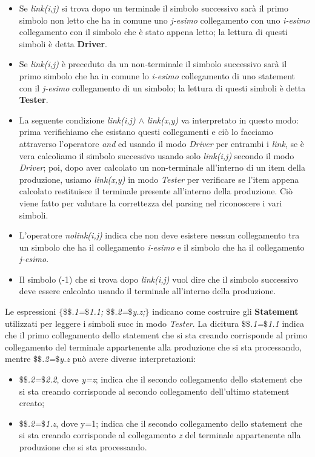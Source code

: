 \begin{itemize}
	\item Se \textit{link(i,j)} si trova dopo un terminale il simbolo successivo sarà il primo simbolo non letto che ha in comune uno \textit{j-esimo} collegamento con uno \textit{i-esimo} collegamento con il simbolo che è stato appena letto; la lettura di questi simboli è detta \textbf{Driver}.
	\item Se \textit{link(i,j)} è preceduto da un non-terminale il simbolo successivo sarà il primo simbolo che ha in comune lo \textit{i-esimo} collegamento di uno statement con il \textit{j-esimo} collegamento di un simbolo; la lettura di questi simboli è detta \textbf{Tester}.
	\item La seguente condizione \textit{link(i,j) $\wedge$ link(x,y)} va interpretato in questo modo: prima verifichiamo che esistano questi collegamenti e ciò lo facciamo attraverso l'operatore \textit{and} ed usando il modo \textit{Driver} per entrambi i \textit{link}, se è vera calcoliamo il simbolo successivo usando solo \textit{link(i,j)} secondo il modo \textit{Driver}; poi, dopo aver calcolato un non-terminale all'interno di un item della produzione, usiamo \textit{link(x,y)} in modo \textit{Tester} per verificare se l'item appena calcolato restituisce il terminale presente all'interno della produzione. Ciò viene fatto per valutare la correttezza del parsing nel riconoscere i vari simboli.
	\item L'operatore \textit{nolink(i,j)} indica che non deve esistere nessun collegamento tra un simbolo che ha il collegamento \textit{i-esimo} e il simbolo che ha il collegamento \textit{j-esimo}.
	\item Il simbolo (-1) che si trova dopo \textit{link(i,j)} vuol dire che il simbolo successivo deve essere calcolato usando il terminale all'interno della produzione.
\end{itemize} 
Le espressioni \textit{$\{$$\$\$$.1=$\$$1.1; $\$\$$.2=$\$$y.z;$\}$} indicano come costruire gli \textbf{Statement} utilizzati per leggere i simboli succ in modo \textit{Tester}. La dicitura \textit{$\$\$$.1=$\$$1.1} indica che il primo collegamento dello statement che si sta creando corrisponde al primo collegamento del terminale appartenente alla produzione che si sta processando, mentre \textit{$\$\$$.2=$\$$y.z} può avere diverse interpretazioni:
\begin{itemize}
	\item \textit{$\$\$$.2=$\$$2.2}, dove \textit{y=z}; indica che il secondo collegamento dello statement che si sta creando corrisponde al secondo collegamento dell'ultimo statement creato;
	\item \textit{$\$\$$.2=$\$$1.z}, dove y=1; indica che il secondo collegamento dello statement che si sta creando corrisponde al collegamento \textit{z} del terminale appartenente alla produzione che si sta processando.
\end{itemize}
